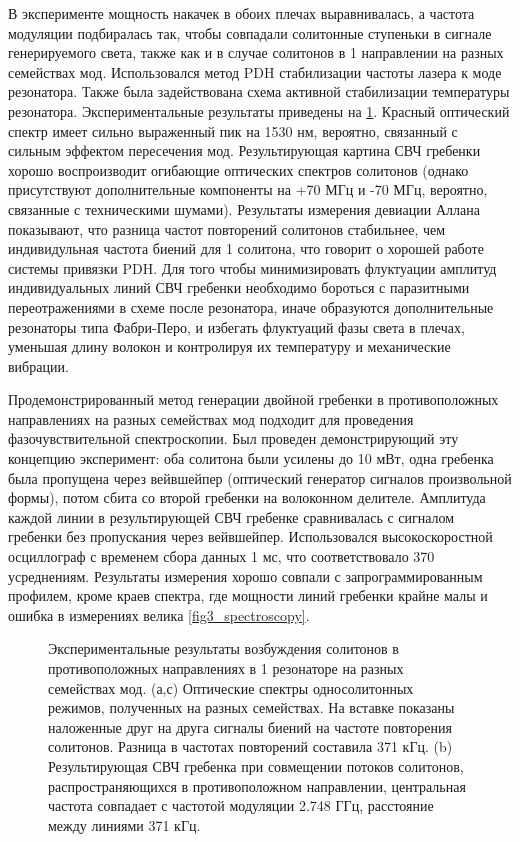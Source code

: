 В эксперименте мощность накачек в обоих плечах выравнивалась, а частота модуляции подбиралась так, чтобы совпадали солитонные ступеньки в сигнале генерируемого света, также как и в случае солитонов в 1 направлении на разных семействах мод. Использовался метод PDH стабилизации частоты лазера к моде резонатора. Также была задействована схема активной стабилизации температуры резонатора. Экспериментальные результаты приведены на \ref{counter_prop_results}. Красный оптический спектр имеет сильно выраженный пик на 1530 нм, вероятно, связанный с сильным эффектом пересечения мод. Результирующая картина СВЧ гребенки хорошо воспроизводит огибающие оптических спектров солитонов (однако присутствуют дополнительные компоненты на +70 МГц и -70 МГц, вероятно, связанные с техническими шумами). Результаты измерения девиации Аллана показывают, что разница частот повторений солитонов стабильнее, чем индивидульная частота биений для 1 солитона, что говорит о хорошей работе системы привязки PDH. Для того чтобы минимизировать флуктуации амплитуд индивидуальных линий СВЧ гребенки необходимо бороться с паразитными переотражениями в схеме после резонатора, иначе образуются дополнительные резонаторы типа Фабри-Перо, и избегать флуктуаций фазы света в плечах, уменьшая длину волокон и контролируя их температуру и механические вибрации.

Продемонстрированный метод генерации двойной гребенки в противоположных направлениях на разных семействах мод подходит для проведения фазочувствительной спектроскопии. Был проведен демонстрирующий эту концепцию эксперимент: оба солитона были усилены до 10 мВт, одна гребенка была пропущена через вейвшейпер (оптический генератор сигналов произвольной формы), потом сбита со второй гребенки на волоконном делителе. Амплитуда каждой линии в результирующей СВЧ гребенке сравнивалась с сигналом гребенки без пропускания через вейвшейпер. Использовался высокоскоростной осциллограф с временем сбора данных 1 мс, что соответствовало 370 усреднениям. Результаты измерения хорошо совпали с запрограммированным профилем, кроме краев спектра, где мощности линий гребенки крайне малы и ошибка в измерениях велика \ref{fig3_spectroscopy}.

\begin{figure}[ht]
\begin{minipage}[ht]{1\linewidth}
\end{minipage}
\caption{Экспериментальные результаты возбуждения солитонов в противоположных направлениях в 1 резонаторе на разных семействах мод. (а,с) Оптические спектры односолитонных режимов, полученных на разных семействах. На вставке показаны наложенные друг на друга сигналы биений на частоте повторения солитонов. Разница в частотах повторений составила 371 кГц. (b) Результирующая СВЧ гребенка при совмещении потоков солитонов, распространяющихся в противоположном направлении, центральная частота совпадает с частотой модуляции 2.748 ГГц, расстояние между линиями 371 кГц.}
\label{counter_prop_results}
\end{figure}

